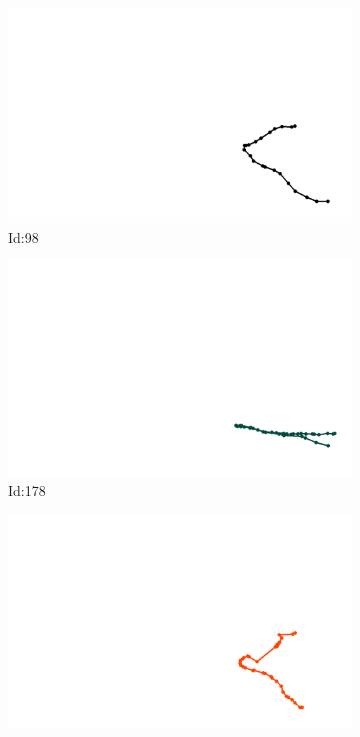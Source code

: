\documentclass[12pt,twoside]{report}
\begin{document}
\begin{figure}
\centering
\begin{subfigure}[b]{0.20\textwidth}
\centering
\includegraphics[width=\textwidth]{../trajectories/98.png}
\caption{Id:98}
\end{subfigure}
\begin{subfigure}[b]{0.20\textwidth}
\centering
\includegraphics[width=\textwidth]{../trajectories/178.png}
\caption{Id:178}
\end{subfigure}
\begin{subfigure}[b]{0.20\textwidth}
\centering
\includegraphics[width=\textwidth]{../trajectories/223.png}

\end{subfigure}
\end{figure}
\end{document}
